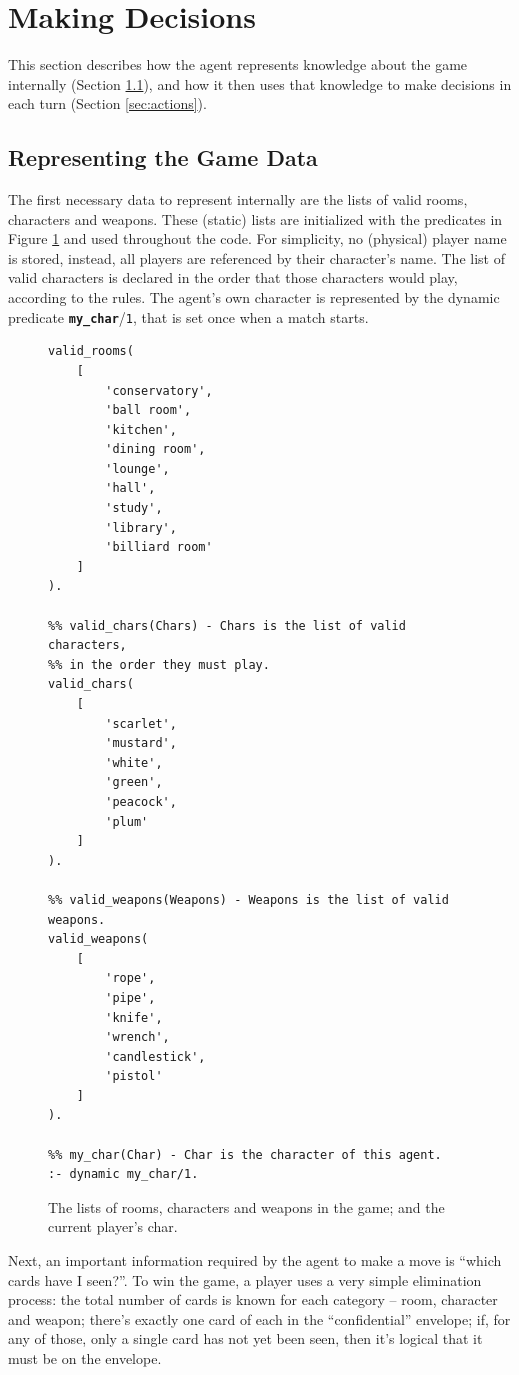 \documentclass[12pt,a4paper]{article}
\newcommand{\varname}[1]{\texttt{#1}}
\newcommand{\varnamebf}[1]{\textbf{\texttt{#1}}}
\newcommand{\predprot}[2]{{\color{MidnightBlue}\varnamebf{#1}}/{\color{Mulberry}\varname{#2}}}
\begin{document}
\section{Making Decisions}
\label{sec:decisions}

This section describes how the agent represents knowledge about the game internally (Section \ref{sec:data}), and how it then uses that knowledge to make decisions in each turn (Section \ref{sec:actions}).

\subsection{Representing the Game Data}
\label{sec:data}

The first necessary data to represent internally are the lists of valid rooms, characters and weapons. These (static) lists are initialized with the predicates in Figure \ref{fig:valid-cards} and used throughout the code. For simplicity, no (physical) player name is stored, instead, all players are referenced by their character's name. The list of valid characters is declared in the order that those characters would play, according to the rules. The agent's own character is represented by the dynamic predicate \predprot{my\_char}{1}, that is set once when a match starts.

\begin{figure}[H]
	\centering
\begin{lstlisting}[style=Prolog-pygsty]
%% valid_rooms(Rooms) - Rooms is the list of valid room names.
valid_rooms(
	[
		'conservatory',
		'ball room',
		'kitchen',
		'dining room',
		'lounge',
		'hall',
		'study',
		'library',
		'billiard room'
	]
).

%% valid_chars(Chars) - Chars is the list of valid characters,
%% in the order they must play.
valid_chars(
	[
		'scarlet',
		'mustard',
		'white',
		'green',
		'peacock',
		'plum'
	]
).

%% valid_weapons(Weapons) - Weapons is the list of valid weapons.
valid_weapons(
	[
		'rope',
		'pipe',
		'knife',
		'wrench',
		'candlestick',
		'pistol'
	]
).

%% my_char(Char) - Char is the character of this agent.
:- dynamic my_char/1.
\end{lstlisting}
	\caption{The lists of rooms, characters and weapons in the game; and the current player's char.} 
	\label{fig:valid-cards}
\end{figure}

Next, an important information required by the agent to make a move is ``which cards have I seen?''. To win the game, a player uses a very simple elimination process: the total number of cards is known for each category -- room, character and weapon;  there's exactly one card of each in the ``confidential'' envelope; if, for any of those, only a single card has not yet been seen, then it's logical that it must be on the envelope.
\end{document}
